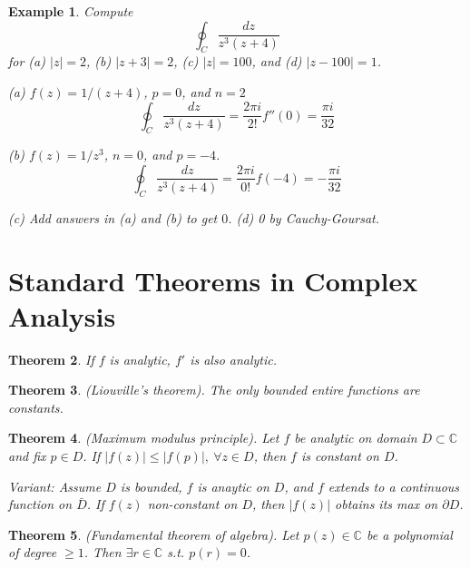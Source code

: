 \documentclass{article}
\newtheorem{theorem}{Theorem}[section]
\newtheorem{example}[theorem]{Example}
\theoremstyle{definition}
\begin{document}
\begin{example} \normalfont
    Compute
    \begin{equation*}
        \oint_C \frac{dz}{z^3 (z+4)}
    \end{equation*}
    for (a) $|z|=2$, (b) $|z+3|=2$, (c) $|z| = 100$, and (d) $|z-100| = 1$.

    (a) $f(z) = 1/(z+4)$, $p=0$, and $n=2$
    \begin{equation*}
        \oint_C \frac{dz}{z^3 (z+4)} = \frac{2 \pi i}{2!} f''(0) = \frac{\pi i}{32}
    \end{equation*}

    (b) $f(z) = 1/z^3$, $n=0$, and $p=-4$.
    \begin{equation*}
        \oint_C \frac{dz}{z^3 (z+4)} = \frac{2 \pi i}{0!} f(-4) = -\frac{\pi i}{32}
    \end{equation*}

    (c) Add answers in (a) and (b) to get $0$. (d) 0 by Cauchy-Goursat.
\end{example}


\section{Standard Theorems in Complex Analysis}

\begin{theorem}
    If $f$ is analytic, $f'$ is also analytic.
\end{theorem}

\begin{theorem}
    (Liouville's theorem). The only bounded entire functions are constants.
\end{theorem}

\begin{theorem}
    (Maximum modulus principle). Let $f$ be analytic on domain $D \subset \mathbb{C}$ and fix $p \in D$. If $|f(z)| \leq |f(p)|,\ \forall z \in D$, then $f$ is constant on $D$. \vspace{1em}

    Variant: Assume $D$ is bounded, $f$ is anaytic on $D$, and $f$ extends to a continuous function on $\bar{D}$. If $f(z)$ non-constant on $D$, then $|f(z)|$ obtains its max on $\partial D$.
\end{theorem}

\begin{theorem}
    (Fundamental theorem of algebra). Let $p(z) \in \mathbb{C}$ be a polynomial of degree $\geq 1$. Then $\exists r \in \mathbb{C}$ s.t. $p(r) = 0$.
\end{theorem}
\end{document}
